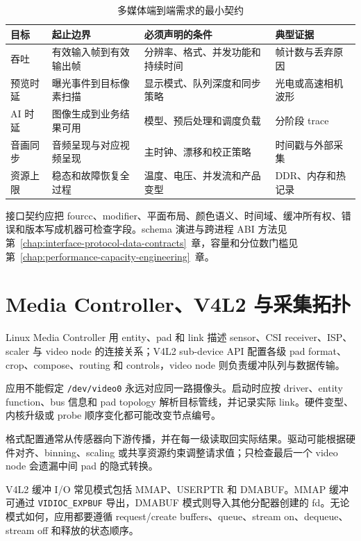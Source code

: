 \begin{table}[H]
  \centering
  \caption{多媒体端到端需求的最小契约}
  \begin{tabular}{p{29mm}p{39mm}p{43mm}p{26mm}}
    \hline
    目标 & 起止边界 & 必须声明的条件 & 典型证据 \\
    \hline
    吞吐 & 有效输入帧到有效输出帧 & 分辨率、格式、并发功能和持续时间 & 帧计数与丢弃原因 \\
    预览时延 & 曝光事件到目标像素扫描 & 显示模式、队列深度和同步策略 & 光电或高速相机波形 \\
    AI 时延 & 图像生成到业务结果可用 & 模型、预后处理和调度负载 & 分阶段 trace \\
    音画同步 & 音频呈现与对应视频呈现 & 主时钟、漂移和校正策略 & 时间戳与外部采集 \\
    资源上限 & 稳态和故障恢复全过程 & 温度、电压、并发流和产品变型 & DDR、内存和热记录 \\
    \hline
  \end{tabular}
\end{table}

接口契约应把 fourcc、modifier、平面布局、颜色语义、时间域、缓冲所有权、错误和版本写成机器可检查字段。schema 演进与跨进程 ABI 方法见 \mbox{第~\ref{chap:interface-protocol-data-contracts}~章}，容量和分位数门槛见 \mbox{第~\ref{chap:performance-capacity-engineering}~章}。

\section{Media Controller、V4L2 与采集拓扑}

Linux Media Controller 用 entity、pad 和 link 描述 sensor、CSI receiver、ISP、scaler 与 video node 的连接关系；V4L2 sub-device API 配置各级 pad format、crop、compose、routing 和 controls，video node 则负责缓冲队列与数据传输\cite{linux-media-api}。

应用不能假定 \texttt{/dev/video0} 永远对应同一路摄像头。启动时应按 driver、entity function、bus 信息和 pad topology 解析目标管线，并记录实际 link。硬件变型、内核升级或 probe 顺序变化都可能改变节点编号。

格式配置通常从传感器向下游传播，并在每一级读取回实际结果。驱动可能根据硬件对齐、binning、scaling 或共享资源约束调整请求值；只检查最后一个 video node 会遗漏中间 pad 的隐式转换。

V4L2 缓冲 I/O 常见模式包括 MMAP、USERPTR 和 DMABUF。MMAP 缓冲可通过 \texttt{VIDIOC\_EXPBUF} 导出，DMABUF 模式则导入其他分配器创建的 fd。无论模式如何，应用都要遵循 request/create buffers、queue、stream on、dequeue、stream off 和释放的状态顺序。

